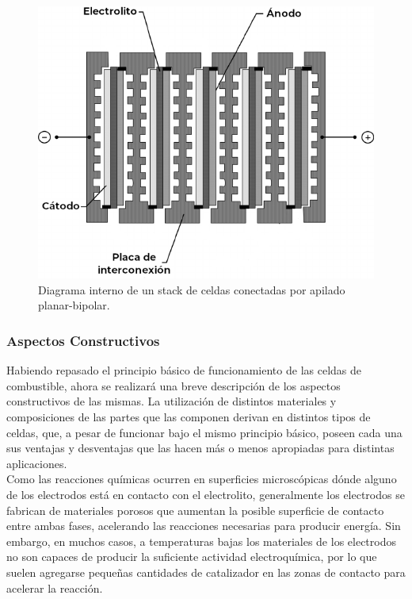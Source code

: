 \begin{figure}[h]
    \centering
    \includegraphics[scale=0.5]{Imagenes/Fuel Cell Stack.png}
    \caption{Diagrama interno de un stack de celdas conectadas por apilado planar-bipolar.}
    \label{fuel_cell_stack}
\end{figure}

\subsubsection{Aspectos Constructivos}

Habiendo repasado el principio básico de funcionamiento de las celdas de combustible, ahora se realizará una breve descripción de los aspectos constructivos de las mismas. La utilización de distintos materiales y composiciones de las partes que las componen derivan en distintos tipos de celdas, que, a pesar de funcionar bajo el mismo principio básico, poseen cada una sus ventajas y desventajas que las hacen más o menos apropiadas para distintas aplicaciones.\\

Como las reacciones químicas ocurren en superficies microscópicas dónde alguno de los electrodos está en contacto con el electrolito, generalmente los electrodos se fabrican de materiales porosos que aumentan la posible superficie de contacto entre ambas fases, acelerando las reacciones necesarias para producir energía. Sin embargo, en muchos casos, a temperaturas bajas los materiales de los electrodos no son capaces de producir la suficiente actividad electroquímica, por lo que suelen agregarse pequeñas cantidades de catalizador en las zonas de contacto para acelerar la reacción.\\

